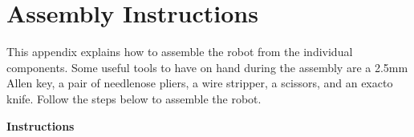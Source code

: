 \chapter{Assembly Instructions}
\label{ch: assemblyInstructions}

This appendix explains how to assemble the robot from the individual components. Some useful tools to have on hand during the assembly are a 2.5mm Allen key, a pair of needlenose pliers, a wire stripper, a scissors, and an exacto knife. Follow the steps below to assemble the robot.

\vspace*{18pt}
\noindent
\begin{Large}\textbf{Instructions}\end{Large}

